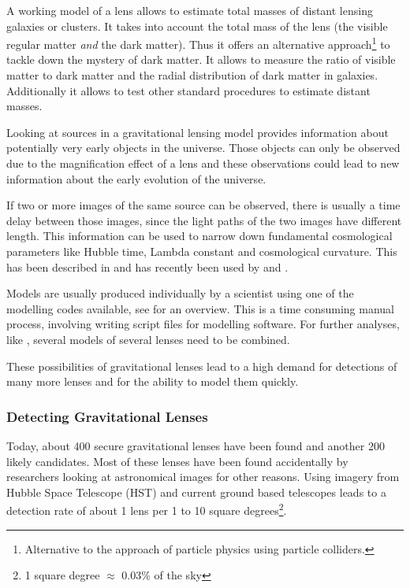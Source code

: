 \documentclass[11pt]{article}
\begin{document}
A working model of a lens allows to estimate total masses of distant lensing galaxies or clusters.
It takes into account the total mass of the lens (the visible regular matter \emph{and} the dark matter\cite{kochanek1995there}).
Thus it offers an alternative approach\footnote{Alternative to the approach of particle physics using particle colliders.} to tackle down the mystery of dark matter.
It allows to measure the ratio of visible matter to dark matter and the radial distribution of dark matter in galaxies\cite{treukoop04}.
Additionally it allows to test other standard procedures to estimate distant masses\cite{kochanek1995there}.

Looking at sources in a gravitational lensing model provides information about potentially very early objects in the universe.
Those objects can only be observed due to the magnification effect of a lens and these observations could lead to new information about the early evolution of the universe\cite{rusin03}.

If two or more images of the same source can be observed, there is usually a time delay between those images, since the light paths of the two images have different length.
This information can be used to narrow down fundamental cosmological parameters like Hubble time, Lambda constant and cosmological curvature.
This has been described in \cite{refsdal1964} and has recently been used by \cite{age_uni} and \cite{2014MNRAS.437..600S}.


Models are usually produced individually by a scientist using one of the modelling codes available, see \cite{overview_soft2013} for an overview.
This is a time consuming manual process, involving writing script files for modelling software.
For further analyses, like \cite{age_uni}, several models of several lenses need to be combined.

These possibilities of gravitational lenses lead to a high demand for detections of many more lenses and for the ability to model them quickly.



\subsubsection{Detecting Gravitational Lenses}

Today, about 400 secure gravitational lenses have been found and another 200 likely candidates.
Most of these lenses have been found accidentally by researchers looking at astronomical images for other reasons.
Using imagery from Hubble Space Telescope (HST) and current ground based telescopes leads to a detection rate of about 1 lens per 1 to 10 square degrees\footnote{1 square degree $\approx$ 0.03\% of the sky}.
\end{document}
